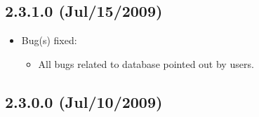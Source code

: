 \subsection{2.3.1.0 (Jul/15/2009)}

\begin{itemize}
  \item Bug(s) fixed:
    \begin{itemize}
      \item All bugs related to database pointed out by users.
    \end{itemize}
\end{itemize}


\subsection{2.3.0.0 (Jul/10/2009)}


